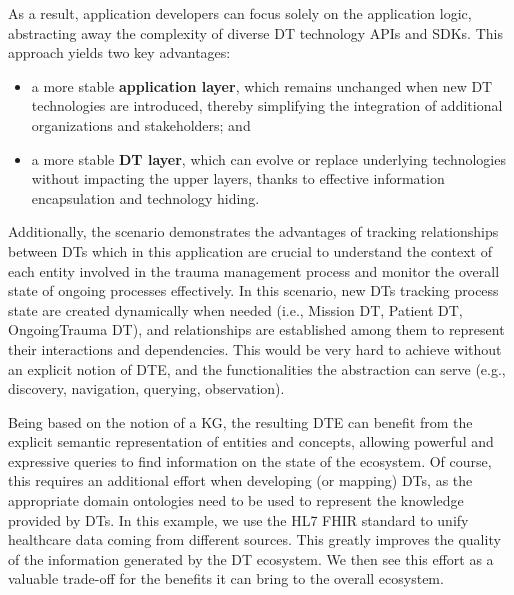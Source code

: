 As a result, application developers can focus solely on the application logic, abstracting away the complexity of diverse \ac{DT} technology APIs and SDKs. 
This approach yields two key advantages:
\begin{itemize}
    \item a more stable \textbf{application layer}, which remains unchanged when new \ac{DT} technologies are introduced, thereby simplifying the integration of additional organizations and stakeholders; and
    \item a more stable \textbf{\ac{DT} layer}, which can evolve or replace underlying technologies without impacting the upper layers, thanks to effective information encapsulation and technology hiding.
\end{itemize}

Additionally, the scenario demonstrates the advantages of tracking relationships between \acp{DT} which in this application are crucial to understand the context of each entity involved in the trauma management process and monitor the overall state of ongoing processes effectively.
%
In this scenario, new \acp{DT} tracking process state are created dynamically when needed (i.e., Mission \ac{DT}, Patient \ac{DT}, OngoingTrauma \ac{DT}), and relationships are established among them to represent their interactions and dependencies.
%
This would be very hard to achieve without an explicit notion of \ac{DTE}, and the functionalities the abstraction can serve (e.g., discovery, navigation, querying, observation). 


Being based on the notion of a \ac{KG}, the resulting \ac{DTE} can benefit from the explicit semantic representation of entities and concepts, allowing powerful and expressive queries to find information on the state of the ecosystem.
%
Of course, this requires an additional effort when developing (or mapping) \acp{DT}, as the appropriate domain ontologies need to be used to represent the knowledge provided by \acp{DT}.
%
In this example, we use the HL7 FHIR standard to unify healthcare data coming from different sources. This greatly improves the quality of the information generated by the \ac{DT} ecosystem.
%
We then see this effort as a valuable trade-off for the benefits it can bring to the overall ecosystem.
